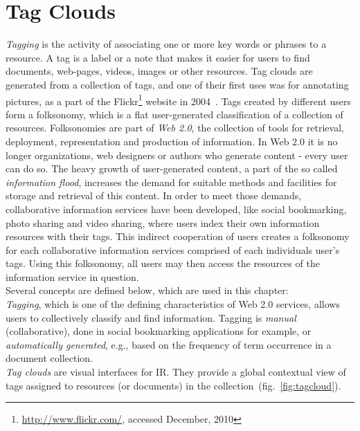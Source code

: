 \chapter{Tag Clouds}
\label{sec:tagclouds}

\textit{Tagging} is the activity of associating one or more key words or phrases to a resource. A tag is a label or a note that makes it easier for users to find documents, web-pages, videos, images or other resources. Tag clouds are generated from a collection of tags, and one of their first uses was for annotating pictures, as a part of the Flickr\footnote{\url{http://www.flickr.com/}, accessed December, 2010} website in 2004~\cite{folksonomiesWeb2.0_2009}. Tags created by different users form a folksonomy, which is a flat user-generated classification of a collection of resources. Folksonomies are part of \textit{Web 2.0}, the collection of tools for retrieval, deployment, representation and production of information. In Web 2.0 it is no longer organizations, web designers or authors who generate content - every user can do so. The heavy growth of user-generated content, a part of the so called \textit{information flood}, increases the demand for suitable methods and facilities for storage and retrieval of this content. In order to meet those demands, collaborative information services have been developed, like social bookmarking, photo sharing and video sharing, where users index their own information resources with their tags. This indirect cooperation of users creates a folksonomy for each collaborative information services comprised of each individuals user's tags. Using this folksonomy, all users may then access the resources of the information service in question. \\ 

Several concepts are defined below, which are used in this chapter:\\

\textit{Tagging}, which is one of the defining characteristics of Web 2.0 services, allows users to collectively classify and find information. Tagging is \textit{manual} (collaborative), done in social bookmarking applications for example, or \textit{automatically generated}, e.g., based on the frequency of term occurrence in a document collection.\\

\textit{Tag clouds} are visual interfaces for \gls{IR}. They provide a global contextual view of tags assigned to resources (or documents) in the collection~(fig.~\ref{fig:tagcloud}). \\

